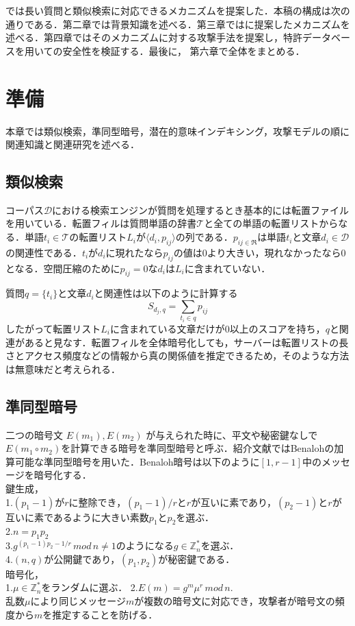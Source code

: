 \documentclass{jsarticle}
\theoremstyle{definition}
\begin{document}
\cite{pang_embellishing_2010}では長い質問と類似検索に対応できるメカニズムを提案した．本稿の構成は次の通りである．第二章では背景知識を述べる．第三章では\cite{pang_embellishing_2010}に提案したメカニズムを述べる．第四章ではそのメカニズムに対する攻撃手法を提案し，特許データベースを用いて\cite{pang_embellishing_2010}の安全性を検証する．最後に， 第六章で全体をまとめる．


\section{準備}
本章では類似検索，準同型暗号，潜在的意味インデキシング，攻撃モデルの順に関連知識と関連研究を述べる．

\subsection{類似検索}
コーパス$\mathcal{D}$における検索エンジンが質問を処理するとき基本的には転置ファイルを用いている．転置フィルは質問単語の辞書$\mathcal{T}$と全ての単語の転置リストからなる．単語$t_i \in \mathcal{T}$の転置リスト$L_i$が$\langle d_i,p_{ij}\rangle$の列である．$p_{ij \in \Re}$は単語$t_i$と文章$d_i \in \mathcal{D}$の関連性である．$t_i$が$d_i$に現れたなら$p_{ij}$の値は$0$より大きい，現れなかったなら$0$となる．空間圧縮のために$p_{ij}=0$な$d_i$は$L_i$に含まれていない．

質問$q=\{t_i\}$と文章$d_i$と関連性は以下のように計算する
\begin{equation}
S_{d_j,q} = \sum_{t_i \in q}p_{ij}
\end{equation}
したがって転置リスト$L_i$に含まれている文章だけが$0$以上のスコアを持ち，$q$と関連があると見なす．転置フィルを全体暗号化しても，サーバーは転置リストの長さとアクセス頻度などの情報から真の関係値を推定できるため，そのような方法は無意味だと考えられる．

\subsection{準同型暗号}\label{enc}
二つの暗号文 $E(m_1), E(m_2)$ が与えられた時に、平文や秘密鍵なしで $E( m_1 \circ m_2 )$を計算できる暗号を準同型暗号と呼ぶ．紹介文献ではBenalohの加算可能な準同型暗号\cite{benaloh_dense_1994}を用いた．Benaloh暗号は以下のように$[1,r-1]$中のメッセージを暗号化する．\\
鍵生成，\\
1.$(p_1-1)$が$r$に整除でき，$(p_1-1)/r$と$r$が互いに素であり，$(p_2-1)$と$r$が互いに素であるように大きい素数$p_1$と$p_2$を選ぶ．\\
2.$n = p_1p_2$\\
3.$g^{(p_1-1){p_2-1}/r} \, mod \, n \neq 1$のようになる$g \in \mathbb{Z}^*_n$を選ぶ．\\
4.$(n,q)$が公開鍵であり，$(p_1,p_2)$が秘密鍵である．\\
暗号化，\\
1.$\mu \in \mathbb{Z}^*_n$をランダムに選ぶ．
2.$E(m) = g^m\mu^r \, mod \, n$.\\
乱数$\mu$により同じメッセージ$m$が複数の暗号文に対応でき，攻撃者が暗号文の頻度から$m$を推定することを防げる．
\end{document}
